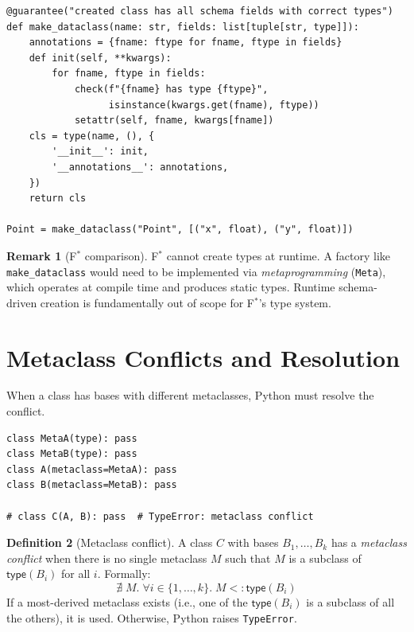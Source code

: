 \documentclass[11pt,a4paper]{report}
\theoremstyle{definition}
\newtheorem{definition}{Definition}[chapter]
\newtheorem{remark}[definition]{Remark}
\theoremstyle{plain}
\newcommand{\fstar}{F$^{*}$}
\begin{document}
\begin{lstlisting}[style=synhopy]
@guarantee("created class has all schema fields with correct types")
def make_dataclass(name: str, fields: list[tuple[str, type]]):
    annotations = {fname: ftype for fname, ftype in fields}
    def init(self, **kwargs):
        for fname, ftype in fields:
            check(f"{fname} has type {ftype}",
                  isinstance(kwargs.get(fname), ftype))
            setattr(self, fname, kwargs[fname])
    cls = type(name, (), {
        '__init__': init,
        '__annotations__': annotations,
    })
    return cls

Point = make_dataclass("Point", [("x", float), ("y", float)])
\end{lstlisting}

\begin{remark}[\fstar{} comparison]
\fstar{} cannot create types at runtime.  A factory like
\lstinline[style=python]{make_dataclass} would need to be implemented via
\emph{metaprogramming} (\lstinline[style=fstar]|Meta|), which operates at
compile time and produces static types.  Runtime schema-driven creation
is fundamentally out of scope for \fstar{}'s type system.
\end{remark}

\section{Metaclass Conflicts and Resolution}

When a class has bases with different metaclasses, Python must resolve
the conflict.

\begin{lstlisting}[style=python]
class MetaA(type): pass
class MetaB(type): pass
class A(metaclass=MetaA): pass
class B(metaclass=MetaB): pass

# class C(A, B): pass  # TypeError: metaclass conflict
\end{lstlisting}

\begin{definition}[Metaclass conflict]
\label{def:meta-conflict}
A class $C$ with bases $B_1, \ldots, B_k$ has a \emph{metaclass conflict}
when there is no single metaclass $M$ such that $M$ is a subclass of
$\mathsf{type}(B_i)$ for all $i$.  Formally:
\[
  \nexists\; M.\; \forall i \in \{1, \ldots, k\}.\; M <: \mathsf{type}(B_i)
\]
If a most-derived metaclass exists (i.e., one of the $\mathsf{type}(B_i)$
is a subclass of all the others), it is used.  Otherwise, Python raises
\lstinline[style=python]{TypeError}.
\end{definition}
\end{document}
